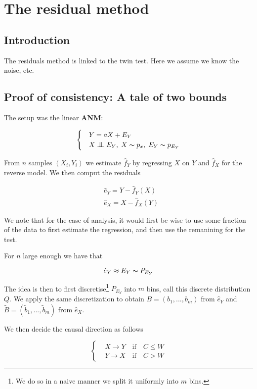 \newpage
\section{The residual method}

\subsection{Introduction}


The residuals method is linked to the twin test. Here we assume we know the noise, etc. 


\subsection{Proof of consistency: A tale of two bounds}

The setup was the linear \textbf{ANM}:

\[ \begin{cases} 
    & Y = aX + E_Y  \\
    & X \bigCI E_Y,\; X \thicksim p_x,\; E_Y \thicksim p_{E_Y}  
 \end{cases}
\]

From $n$ samples $(X_i, Y_i)$ we estimate $\hat{f}_Y$ by regressing $X$ on $Y$ and 
$\hat{f}_X$ for the reverse model. We then comput the residuals

\begin{align}
    &  \hat{e}_Y = Y - \hat{f}_Y(X)\\
    &  \hat{e}_X = X - \hat{f}_X(Y)
\end{align}

We note that for the ease of analysis, it would first be wise to use some fraction 
of the data to first estimate the regression, and then use the remanining for the test.

For $n$ large enough we have that 

$$
    \hat{e}_Y \approx E_Y \thicksim P_{E_Y}
$$

The idea is then to first discretise\footnote{We do so in a naive manner we split
it uniformly into $m$ bins.} $P_{E_Y}$ into $m$ bins, call this discrete distribution
$Q$. We apply the same discretization to obtain $B = (b_1, ..., b_m)$ from $\hat{e}_Y$
and $\tilde{B} = (\tilde{b}_1, ..., \tilde{b}_m)$ from $\hat{e}_X$.

We then decide the causal direction as follows

\[ \begin{cases} 
    & X \rightarrow Y \quad \text{if} \quad C \leq W  \\
    & Y \rightarrow X \quad \text{if} \quad C > W  
 \end{cases}
\]

